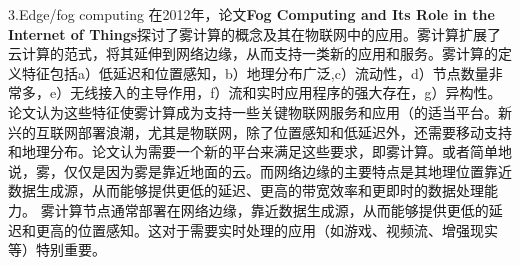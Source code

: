 \documentclass[a4paper,twoside]{scrbook}
\begin{document}
3.Edge/fog computing
在2012年，论文\textbf{Fog Computing and Its Role in the Internet of Things}探讨了雾计算的概念及其在物联网中的应用。雾计算扩展了云计算的范式，将其延伸到网络边缘，从而支持一类新的应用和服务。雾计算的定义特征包括a）低延迟和位置感知，b）地理分布广泛,c）流动性，d）节点数量非常多，e）无线接入的主导作用，f）流和实时应用程序的强大存在，g）异构性。论文认为这些特征使雾计算成为支持一些关键物联网服务和应用（的适当平台。新兴的互联网部署浪潮，尤其是物联网，除了位置感知和低延迟外，还需要移动支持和地理分布。论文认为需要一个新的平台来满足这些要求，即雾计算。或者简单地说，雾，仅仅是因为雾是靠近地面的云。而网络边缘的主要特点是其地理位置靠近数据生成源，从而能够提供更低的延迟、更高的带宽效率和更即时的数据处理能力。
雾计算节点通常部署在网络边缘，靠近数据生成源，从而能够提供更低的延迟和更高的位置感知。这对于需要实时处理的应用（如游戏、视频流、增强现实等）特别重要。
\end{document}

